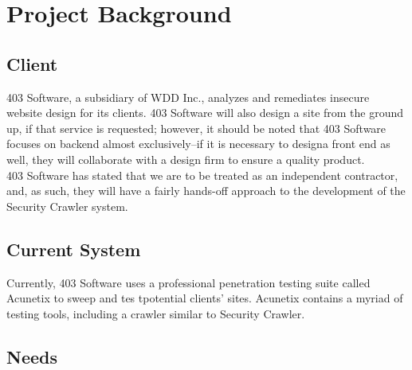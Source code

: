 \section{Project Background}
\subsection{Client}
	403 Software, a subsidiary of WDD Inc., analyzes and remediates insecure website design for its clients.  403 Software will also design a site from the ground up, if that service is requested; however, it should be noted that 403 Software focuses on backend almost exclusively--if it is necessary to designa  front end as well, they will collaborate with a design firm to ensure a quality product. \\
403 Software has stated that we are to be treated as an independent contractor, and, as such, they will have a fairly hands-off approach to the development of the Security Crawler system.

\subsection{Current System}

	Currently, 403 Software uses a professional penetration testing suite called Acunetix to sweep and tes tpotential clients' sites.  Acunetix contains a myriad of testing tools, including a crawler similar to Security Crawler.

\subsection{Needs}

